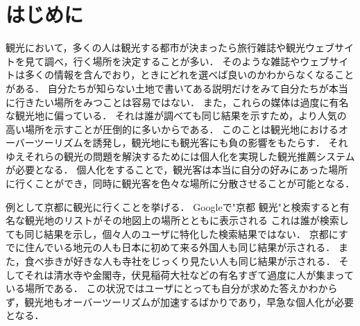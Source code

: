 \documentclass[a4j,10pt, twocolumn]{jarticle}
\begin{document}


\section{はじめに} \label{introduction}
観光において，多くの人は観光する都市が決まったら旅行雑誌や観光ウェブサイトを見て調べ，行く場所を決定することが多い．
そのような雑誌やウェブサイトは多くの情報を含んでおり，ときにどれを選べば良いのかわからなくなることがある．
自分たちが知らない土地で書いてある説明だけをみて自分たちが本当に行きたい場所をみつことは容易ではない．
また，これらの媒体は過度に有名な観光地に偏っている．
それは誰が調べても同じ結果を示すため，より人気の高い場所を示すことが圧倒的に多いからである．
このことは観光地におけるオーバーツーリズムを誘発し，観光地にも観光客にも負の影響をもたらす．
それゆえそれらの観光の問題を解決するためには個人化を実現した観光推薦システムが必要となる．
個人化をすることで，観光客は本当に自分の好みにあった場所に行くことができ，同時に観光客を色々な場所に分散させることが可能となる．

例として京都に観光に行くことを挙げる．
Googleで"京都 観光"と検索すると有名な観光地のリストがその地図上の場所とともに表示される
これは誰が検索しても同じ結果を示し，個々人のユーザに特化した検索結果ではない．
京都にすでに住んでいる地元の人も日本に初めて来る外国人も同じ結果が示される．
また，食べ歩きが好きな人も寺社をじっくり見たい人も同じ結果が示される．
そしてそれは清水寺や金閣寺，伏見稲荷大社などの有名すぎて過度に人が集まっている場所である．
この状況ではユーザにとっても自分が求めた答えかわからず，観光地もオーバーツーリズムが加速するばかりであり，早急な個人化が必要となる．
\end{document}
